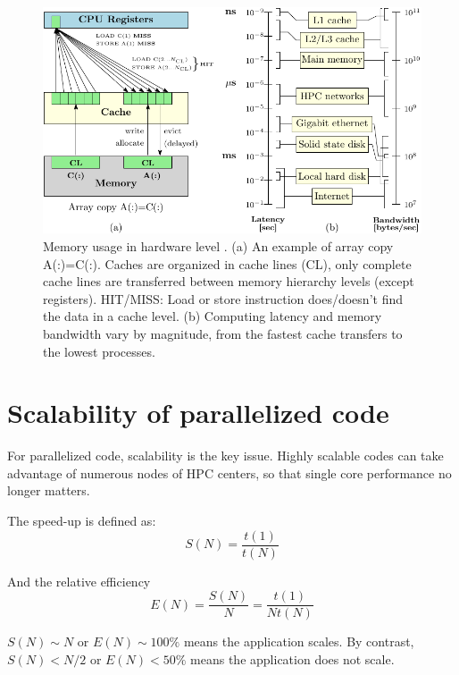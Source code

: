 \begin{figure}[h]
\begin{centering}
\includegraphics{_figure/memory}
\par\end{centering}

\caption[Memory usage in hardware level]{Memory usage in hardware level \citep{LRZ-cours}. (a) An example
of array copy A(:)=C(:). Caches are organized in cache lines (CL),
only complete cache lines are transferred between memory hierarchy
levels (except registers). HIT/MISS: Load or store instruction does/doesn't
find the data in a cache level. (b) Computing latency and memory bandwidth
vary by magnitude, from the fastest cache transfers to the lowest
processes.\label{fig:Memory}}
\end{figure}



\section{Scalability of parallelized code}

For parallelized code, scalability is the key issue. Highly scalable
codes can take advantage of numerous nodes of HPC centers, so that
single core performance no longer matters. 

The speed-up is defined as:
\begin{equation}
S(N)=\dfrac{t(1)}{t(N)}
\end{equation}


And the relative efficiency
\begin{equation}
E(N)=\dfrac{S(N)}{N}=\dfrac{t(1)}{Nt(N)}
\end{equation}


$S(N)\sim N$ or $E(N)\sim100\%$ means the application scales. By
contrast, $S(N)<N/2$ or $E(N)<50\%$ means the application does not
scale. 

